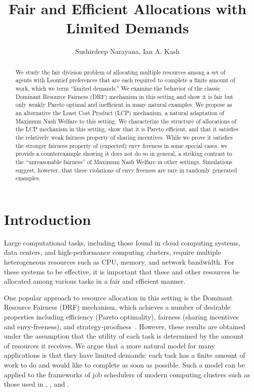 \documentclass[letterpaper]{article} %
\title{Fair and Efficient Allocations with Limited Demands  }
\author{

    Sushirdeep Narayana, Ian A. Kash \\
}
\theoremstyle{definition}
\begin{document}

\maketitle

\begin{abstract}
We study the fair division problem of allocating multiple resources among a set of agents with Leontief preferences that are each required to complete a finite amount of work, which we term ``limited demands.'' We examine the behavior of the classic Dominant Resource Fairness (DRF) mechanism in this setting and show it is fair but only weakly Pareto optimal and inefficient in many natural examples. We propose as an alternative the Least Cost Product (LCP) mechanism, a natural adaptation of Maximum Nash Welfare to this setting. 
We characterize the structure of allocations of the LCP mechanism in this setting, show that it is Pareto efficient, and that it satisfies the relatively weak fairness property of sharing incentives.  While we prove it satisfies the stronger fairness property of (expected) envy freeness in some special cases, we provide a counterexample showing it does not do so in general, a striking contrast to the ``unreasonable fairness'' of Maximum Nash Welfare in other settings.  Simulations suggest, however, that these violations of envy freeness are rare in randomly generated examples.  
\end{abstract}

\noindent
\section{Introduction}

\noindent Large computational tasks, including those found in cloud computing systems, data centers, and high-performance computing clusters, require multiple heterogeneous resources such as CPU, memory, and network bandwidth.  For these systems to be effective, it is important that these and other resources be allocated among various tasks in a fair and efficient manner.

One popular approach to resource allocation in this setting is the Dominant Resource Fairness (DRF) mechanism, which achieves a number of desirable properties including efficiency (Pareto optimality), fairness (sharing incentives and envy-freeness), and strategy-proofness~\cite{Ghodsi2011drf,parkes2015beyond}.  However, these results are obtained under the assumption that the utility of each task is determined by the amount of resources it receives.  We argue that a more natural model for many applications is that they have limited demands: each task has a finite amount of work to do and would like to complete as soon as possible. Such a model can be applied to the frameworks of job schedulers of modern computing clusters  such as those used in \citet{Hindman2011Mesos}, \citet{vavilapalli2013apacheHadoopYARN}, and \citet{Grandl2016Carbyne}.
\end{document}
